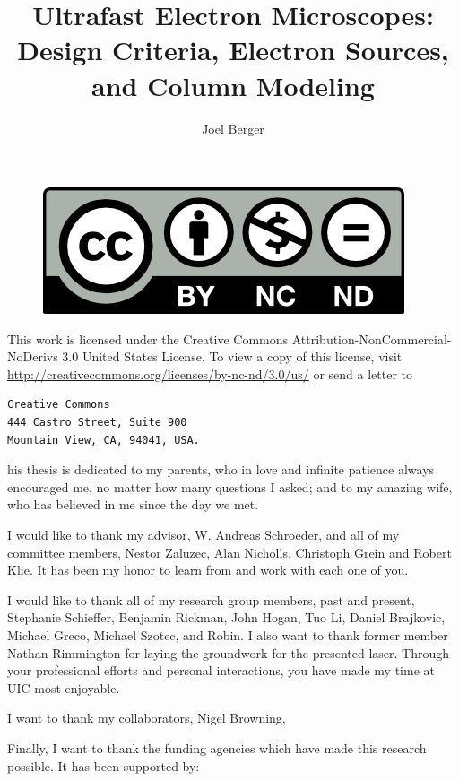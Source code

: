 \documentclass{uicthesi}
\title{Ultrafast Electron Microscopes: Design Criteria, Electron Sources, and Column Modeling}
\author{Joel Berger}
\begin{document}
\maketitle

\newpage
\begin{figure}
  \centering
  \includegraphics{by-nc-nd}
\end{figure}
This work is licensed under the Creative Commons Attribution-NonCommercial-NoDerivs 3.0 United States License.
To view a copy of this license, visit \url{http://creativecommons.org/licenses/by-nc-nd/3.0/us/} or send a letter to
\begin{verbatim}
Creative Commons
444 Castro Street, Suite 900
Mountain View, CA, 94041, USA.
\end{verbatim}


\dedication
This thesis is dedicated to my parents, who in love and infinite patience always encouraged me, no matter how many questions I asked; and to my amazing wife, who has believed in me since the day we met. 
 
\acknowledgment
I would like to thank my advisor, W. Andreas Schroeder, and all of my committee members, Nestor Zaluzec, %
Alan Nicholls, %
Christoph Grein and Robert Klie.
It has been my honor to learn from and work with each one of you.

I would like to thank all of my research group members, past and present, Stephanie Schieffer, Benjamin Rickman, John Hogan, Tuo Li, Daniel Brajkovic, Michael Greco, Michael Szotec, %
and Robin. %
I also want to thank former member Nathan Rimmington %
for laying the groundwork for the presented laser.
Through your professional efforts and personal interactions, you have made my time at UIC most enjoyable.

I want to thank my collaborators, Nigel Browning, %

Finally, I want to thank the funding agencies which have made this research possible.
It has been supported by: %
\end{document}
